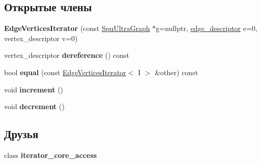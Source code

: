 \subsection*{Открытые члены}
\begin{DoxyCompactItemize}
\item 
\mbox{\label{class_s_p_u___g_r_a_p_h_1_1_spu_ultra_graph_1_1_edge_vertices_iterator_abfe6fdae2bd15033dc8003791fa3f80d}} 
{\bfseries Edge\+Vertices\+Iterator} (const \hyperlink{class_s_p_u___g_r_a_p_h_1_1_spu_ultra_graph}{Spu\+Ultra\+Graph} $\ast$g=nullptr, \hyperlink{class_s_p_u___g_r_a_p_h_1_1_spu_ultra_graph_a5f3776e003ef0a1648f1d9f84289810b}{edge\+\_\+descriptor} e=0, vertex\+\_\+descriptor v=0)
\item 
\mbox{\label{class_s_p_u___g_r_a_p_h_1_1_spu_ultra_graph_1_1_edge_vertices_iterator_a8875d0fd54c7e8619acfd02bcb87d558}} 
vertex\+\_\+descriptor {\bfseries dereference} () const
\item 
\mbox{\label{class_s_p_u___g_r_a_p_h_1_1_spu_ultra_graph_1_1_edge_vertices_iterator_ad165a565fb26b4fcd46a30a80fc457bb}} 
bool {\bfseries equal} (const \hyperlink{class_s_p_u___g_r_a_p_h_1_1_spu_ultra_graph_1_1_edge_vertices_iterator}{Edge\+Vertices\+Iterator}$<$ I $>$ \&other) const
\item 
\mbox{\label{class_s_p_u___g_r_a_p_h_1_1_spu_ultra_graph_1_1_edge_vertices_iterator_a02101f156a9ff9d781a908df52bf32d0}} 
void {\bfseries increment} ()
\item 
\mbox{\label{class_s_p_u___g_r_a_p_h_1_1_spu_ultra_graph_1_1_edge_vertices_iterator_a19530f355f4156c36d5e0e302c696662}} 
void {\bfseries decrement} ()
\end{DoxyCompactItemize}
\subsection*{Друзья}
\begin{DoxyCompactItemize}
\item 
\mbox{\label{class_s_p_u___g_r_a_p_h_1_1_spu_ultra_graph_1_1_edge_vertices_iterator_a0975271623c74c5b89bdf8d7fbce69c4}} 
class {\bfseries iterator\+\_\+core\+\_\+access}
\end{DoxyCompactItemize}


